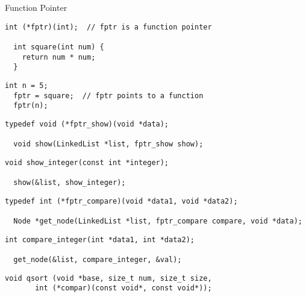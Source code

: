 \begin{frame}{}
  \centerline{\LARGE Function Pointer}
\end{frame}

\begin{frame}[fragile]{}
  \begin{lstlisting}[style = Cstyle]
  int (*fptr)(int);  // fptr is a function pointer

  int square(int num) {
    return num * num;
  }
  \end{lstlisting}

  \begin{lstlisting}[style = Cstyle]
  int n = 5;
  fptr = square;  // fptr points to a function
  fptr(n);
  \end{lstlisting}
\end{frame}

\begin{frame}[fragile]{}
  \begin{lstlisting}[style = Cstyle]
  typedef void (*fptr_show)(void *data);

  void show(LinkedList *list, fptr_show show);
  \end{lstlisting}

  \centerline{\large {}}

  \vspace{0.60cm}
  \pause
  \begin{lstlisting}[style = Cstyle]
  void show_integer(const int *integer);

  show(&list, show_integer);
  \end{lstlisting}

  \centerline{\large {}}
\end{frame}

\begin{frame}[fragile]{}
  \begin{lstlisting}[style = Cstyle]
  typedef int (*fptr_compare)(void *data1, void *data2);

  Node *get_node(LinkedList *list, fptr_compare compare, void *data);
  \end{lstlisting}

  \centerline{\large {}}

  \vspace{0.60cm}
  \pause
  \begin{lstlisting}[style = Cstyle]
  int compare_integer(int *data1, int *data2);

  get_node(&list, compare_integer, &val);
  \end{lstlisting}

  \centerline{\large {}}
\end{frame}

\begin{frame}[fragile]{}
  \begin{lstlisting}[style = Cstyle]
  void qsort (void *base, size_t num, size_t size,
       int (*compar)(const void*, const void*));
  \end{lstlisting}

  \centerline{\large {}}
\end{frame}
